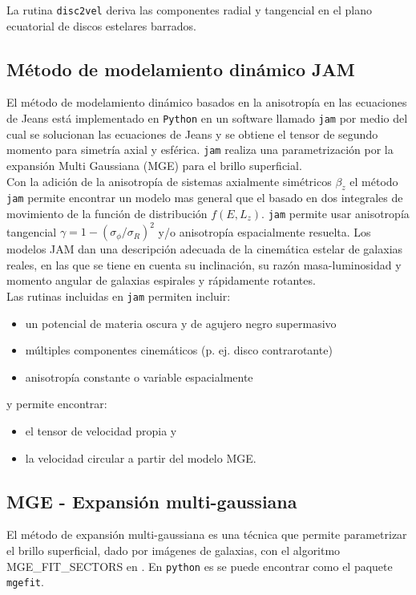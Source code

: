 La rutina \verb+disc2vel+ deriva las componentes radial y tangencial en el plano ecuatorial de discos estelares barrados.


\subsection{Método de modelamiento dinámico JAM}

El método de modelamiento dinámico basados en la anisotropía en las ecuaciones de Jeans está implementado en \verb+Python+ en un software llamado \verb+jam+ por medio del cual se solucionan las ecuaciones de Jeans y se obtiene el tensor de segundo momento para simetría axial y esférica. \verb+jam+ realiza una parametrización por la expansión Multi Gaussiana (MGE) para el brillo superficial.\\

Con la adición de la anisotropía de sistemas axialmente simétricos $\beta_z$ el método \verb+jam+ permite encontrar un modelo mas general que el basado en dos integrales de movimiento de la función de distribución $f(E, L_z)$. \verb+jam+ permite usar anisotropía tangencial $\gamma = 1-(\sigma_{\phi}/\sigma_R)^2$ y/o anisotropía espacialmente resuelta. Los modelos JAM dan una descripción adecuada de la cinemática estelar de galaxias reales, en las que se tiene en cuenta su inclinación, su razón masa-luminosidad y momento angular de galaxias espirales y rápidamente rotantes.\\

Las rutinas incluidas en \verb+jam+ permiten incluir:
\begin{itemize}
\item un potencial de materia oscura y de agujero negro supermasivo
\item múltiples componentes cinemáticos (p. ej. disco contrarotante)
\item anisotropía constante o variable espacialmente
\end{itemize}

y permite encontrar:

\begin{itemize}
\item el tensor de velocidad propia y
\item la velocidad circular a partir del modelo MGE.
\end{itemize}


\subsection{MGE - Expansión multi-gaussiana}
El método de expansión multi-gaussiana es una técnica que permite parametrizar el brillo superficial, dado por imágenes de galaxias, con el algoritmo \textsc{MGE\_FIT\_SECTORS} en \cite{C02}. En \verb+python+ es se puede encontrar como el paquete \verb+mgefit+.

